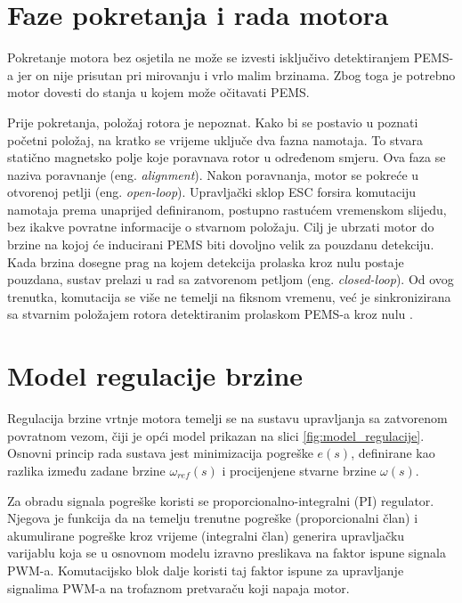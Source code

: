 \documentclass[diplomskirad]{fer}
\begin{document}
\newpage

\section{Faze pokretanja i rada motora}
\label{sec:pokretanje}

Pokretanje motora bez osjetila ne može se izvesti isključivo detektiranjem
PEMS-a jer on nije prisutan pri mirovanju i vrlo malim brzinama. Zbog toga je
potrebno motor dovesti do stanja u kojem može očitavati PEMS.

Prije pokretanja, položaj rotora je nepoznat. Kako bi se postavio u poznati
početni položaj, na kratko se vrijeme uključe dva fazna namotaja. To stvara
statično magnetsko polje koje poravnava rotor u određenom smjeru. Ova faza se
naziva poravnanje (eng. \textit{alignment}). Nakon poravnanja, motor se pokreće
u otvorenoj petlji (eng. \textit{open-loop}). Upravljački sklop ESC forsira
komutaciju namotaja prema unaprijed definiranom, postupno rastućem vremenskom
slijedu, bez ikakve povratne informacije o stvarnom položaju. Cilj je ubrzati
motor do brzine na kojoj će inducirani PEMS biti dovoljno velik za pouzdanu
detekciju. Kada brzina dosegne prag na kojem detekcija prolaska kroz nulu
postaje pouzdana, sustav prelazi u rad sa zatvorenom petljom (eng.
\textit{closed-loop}). Od ovog trenutka, komutacija se više ne temelji na
fiksnom vremenu, već je sinkronizirana sa stvarnim položajem rotora
detektiranim prolaskom PEMS-a kroz nulu \cite{Recasens2021}.

\section{Model regulacije brzine}
\label{sec:model_motora}

Regulacija brzine vrtnje motora temelji se na sustavu upravljanja sa zatvorenom
povratnom vezom, čiji je opći model prikazan na slici
\ref{fig:model_regulacije}. Osnovni princip rada sustava jest minimizacija
pogreške $e(s)$, definirane kao razlika između zadane brzine $\omega_{ref}(s)$
i procijenjene stvarne brzine $\omega(s)$.

Za obradu signala pogreške koristi se proporcionalno-integralni (PI) regulator.
Njegova je funkcija da na temelju trenutne pogreške (proporcionalni član) i
akumulirane pogreške kroz vrijeme (integralni član) generira upravljačku
varijablu koja se u osnovnom modelu izravno preslikava na faktor ispune signala
PWM-a. Komutacijsko blok dalje koristi taj faktor ispune za upravljanje
signalima PWM-a na trofaznom pretvaraču koji napaja motor.
\end{document}
